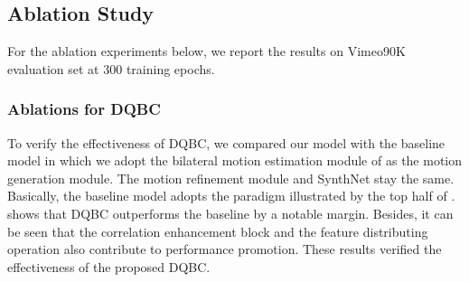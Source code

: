 \documentclass{article}
\begin{document}
\subsection{Ablation Study}

For the ablation experiments below, we report the results on Vimeo90K evaluation set at 300 training epochs.

\subsubsection{Ablations for DQBC}

To verify the effectiveness of DQBC, we compared our model with the baseline model in which we adopt the bilateral motion estimation module of \cite{abme} as the motion generation module. The motion refinement module and SynthNet stay the same. Basically, the baseline model adopts the paradigm illustrated by the top half of .  shows that DQBC outperforms the baseline by a notable margin. Besides, it can be seen that the correlation enhancement block and the feature distributing operation also contribute to performance promotion. These results verified the effectiveness of the proposed DQBC.




\begin{table}[htbp]
    \centering
    \caption{Ablation experiments for DQBC. ``enh" represents the correlation enhancement block and ``dist" represents the feature distributing operation.}
    \label{tab:ab1}
\end{table}

\begin{table}[htbp]
    \centering
    \caption{Contrastive experiments for alternative designs for Motion Refinement Module (MRM).}
    \label{tab:ab2}
\end{table}
\end{document}
